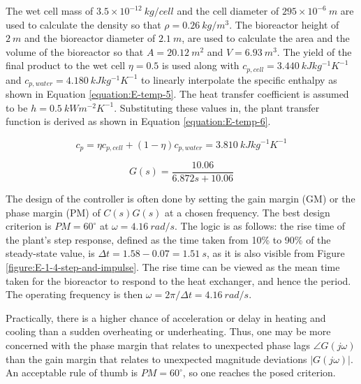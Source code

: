 The wet cell mass of $3.5 \times 10^{-12} \ kg/cell$ and the cell diameter of $295 \times 10^{-6} \ m$ \cite{E-Furuhashi2021} are used to calculate the density so that $\rho = 0.26 \ kg/m^3$. The bioreactor height of $2 \ m$ and the bioreactor diameter of $2.1 \ m$, are used to calculate the area and the volume of the bioreactor so that $A = 20.12 \ m^2$ and $V = 6.93 \ m^3$. The yield of the final product to the wet cell $\eta = 0.5$ is used along with $c_{p, cell} = 3.440 \ kJ kg^{-1} K^{-1}$ \cite{E-Fellows2009} and $c_{p, water} = 4.180 \ kJ kg^{-1} K^{-1}$ to linearly interpolate the specific enthalpy as shown in Equation \ref{equation:E-temp-5}. The heat transfer coefficient is assumed to be $h = 0.5 \ kW m^{-2} K^{-1}$. Substituting these values in, the plant transfer function is derived as shown in Equation \ref{equation:E-temp-6}.

\vspace{-5mm}
\begin{equation}
    c_p = \eta c_{p, cell} + (1-\eta) c_{p, water} = 3.810 \ kJ kg^{-1} K^{-1}
    \label{equation:E-temp-5}
\end{equation}

\vspace{-10mm}
\begin{equation}
    G(s) = \frac{10.06}{6.872 s + 10.06}
    \label{equation:E-temp-6}
\end{equation}

The design of the controller is often done by setting the gain margin (GM) or the phase margin (PM) of $C(s)G(s)$ at a chosen frequency. The best design criterion is $PM = 60 ^{\circ}$ at $\omega = 4.16 \ rad/s$. The logic is as follows: the rise time of the plant's step response, defined as the time taken from 10\% to 90\% of the steady-state value, is $\Delta t = 1.58 - 0.07 = 1.51 \ s$, as it is also visible from Figure \ref{figure:E-1-4-step-and-impulse}. The rise time can be viewed as the mean time taken for the bioreactor to respond to the heat exchanger, and hence the period. The operating frequency is then $\omega = 2\pi / \Delta t = 4.16 \ rad/s$.

Practically, there is a higher chance of acceleration or delay in heating and cooling than a sudden overheating or underheating. Thus, one may be more concerned with the phase margin that relates to unexpected phase lags $\angle G(j \omega)$ than the gain margin that relates to unexpected magnitude deviations $|G(j \omega)|$. An acceptable rule of thumb is $PM = 60 ^{\circ}$, so one reaches the posed criterion.

